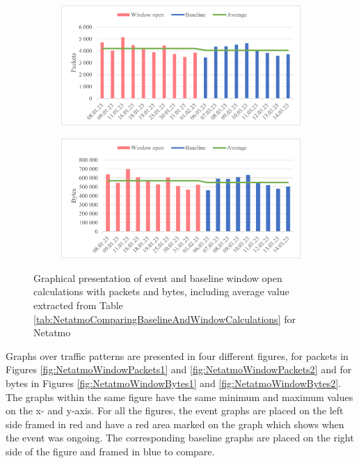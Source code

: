 \begin{figure}[H]
    \centering
    \begin{subfigure}{0.8\textwidth}
       \centering
       \includegraphics[width=1\hsize]{figures/Netatmo_Window_Calculations_Packets.png} 
    \end{subfigure}
    \begin{subfigure}{0.8\textwidth}
        \centering
        \includegraphics[width=1\hsize]{figures/Netatmo_Window_Calculations_Bytes.png} 
    \end{subfigure}
    \caption{Graphical presentation of event and baseline window open calculations with packets and bytes, including average value extracted from Table \ref{tab:NetatmoComparingBaselineAndWindowCalculations} for Netatmo}
    \label{fig:NetatmoWindowCalculations}
\end{figure}

Graphs over traffic patterns are presented in four different figures, for packets in Figures \ref{fig:NetatmoWindowPackets1} and \ref{fig:NetatmoWindowPackets2} and for bytes in Figures \ref{fig:NetatmoWindowBytes1} and \ref{fig:NetatmoWindowBytes2}. The graphs within the same figure have the same minimum and maximum values on the x- and y-axis. For all the figures, the event graphs are placed on the left side framed in red and have a red area marked on the graph which shows when the event was ongoing. The corresponding baseline graphs are placed on the right side of the figure and framed in blue to compare. 

